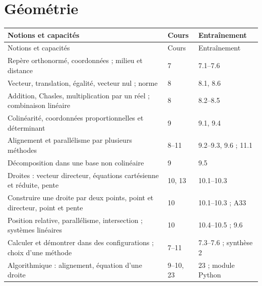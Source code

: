 \documentclass[11pt,a4paper,oneside]{book}
\begin{document}
\section{Géométrie}
\small
\begin{longtable}{p{}p{}p{}}
\toprule Notions et capacités & Cours & Entraînement\\\midrule
\endfirsthead\toprule Notions et capacités & Cours & Entraînement\\\midrule\endhead
Repère orthonormé, coordonnées ; milieu et distance & 7 & 7.1--7.6\\
Vecteur, translation, égalité, vecteur nul ; norme & 8 & 8.1, 8.6\\
Addition, Chasles, multiplication par un réel ; combinaison linéaire & 8 & 8.2--8.5\\
Colinéarité, coordonnées proportionnelles et déterminant & 9 & 9.1, 9.4\\
Alignement et parallélisme par plusieurs méthodes & 8--11 & 9.2--9.3, 9.6 ; 11.1\\
Décomposition dans une base non colinéaire & 9 & 9.5\\
Droites : vecteur directeur, équations cartésienne et réduite, pente & 10, 13 & 10.1--10.3\\
Construire une droite par deux points, point et directeur, point et pente & 10 & 10.1--10.3 ; A33\\
Position relative, parallélisme, intersection ; systèmes linéaires & 10 & 10.4--10.5 ; 9.6\\
Calculer et démontrer dans des configurations ; choix d'une méthode & 7--11 & 7.3--7.6 ; synthèse 2\\
Algorithmique : alignement, équation d'une droite & 9--10, 23 & 23 ; module Python\\
\bottomrule\end{longtable}
\normalsize
\end{document}
